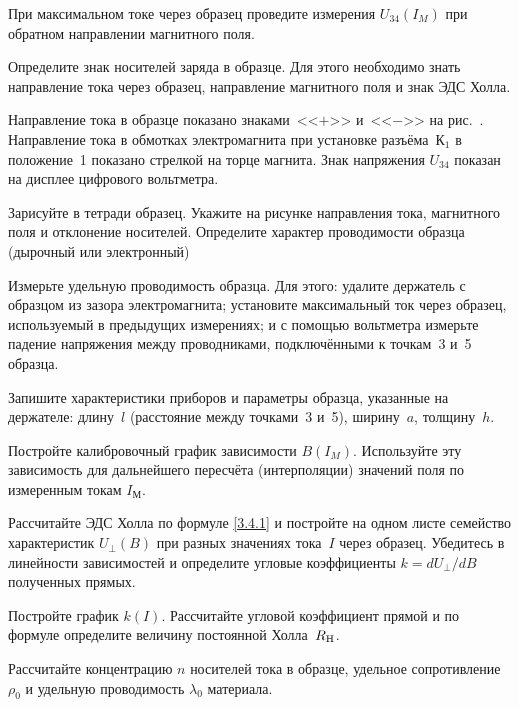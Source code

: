 \begin{lab:task}
\item При максимальном токе через образец проведите измерения $U_{34}(I_{M})$ 
при обратном направлении магнитного поля.

\item Определите знак носителей заряда в образце. Для этого необходимо знать
направление тока через образец, направление магнитного поля и знак ЭДС Холла.

Направление тока в образце показано знаками~<<$+$>> и~<<$-$>> на
рис.~. Направление тока в обмотках электромагнита при 
установке разъёма~К$_1$ в положение~1 показано стрелкой на торце магнита.
Знак напряжения $U_{34}$ показан на дисплее цифрового вольтметра.

Зарисуйте в тетради образец. Укажите на рисунке направления тока, магнитного
поля и отклонение носителей. Определите характер проводимости образца
(дырочный или электронный)

\item Измерьте удельную проводимость образца. Для этого: 
удалите держатель с образцом из зазора электромагнита;
установите максимальный ток через образец, используемый в предыдущих измерениях;
и с помощью вольтметра измерьте падение напряжения между проводниками, 
подключёнными к точкам~3 и~5 образца.

\item Запишите характеристики приборов и параметры образца, указанные на держателе:
длину~$l$ (расстояние между точками~3 и~5), ширину~$a$, толщину~$h$.



\item Постройте калибровочный график зависимости $B(I_{M})$. 
Используйте эту зависимость для дальнейшего пересчёта (интерполяции)
значений поля по измеренным токам $I_{М}$.


\item Рассчитайте ЭДС Холла по формуле \eqref{3.4.1} и постройте на одном листе
семейство характеристик $U_{\perp}(B)$ при разных значениях тока~$I$ через
образец. Убедитесь в линейности зависимостей и определите угловые 
коэффициенты $k=dU_{\perp}/dB$ полученных прямых.

\item Постройте график $k(I)$. Рассчитайте угловой коэффициент прямой 
и по формуле  определите величину постоянной Холла~$R_{\rm H}$.

\item Рассчитайте концентрацию $n$ носителей тока в образце,
удельное сопротивление $\rho_0$ и удельную проводимость $\lambda_0$ материала.


\end{lab:task}
